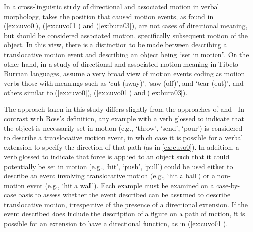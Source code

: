 In a cross-linguistic study of directional and associated motion in verbal morphology, \citet[62]{rossCrosslinguisticSurveyAssociated2021} takes the position that caused motion events, as found in (\ref{ex:cuvo0}), (\ref{ex:cuvo01}) and (\ref{ex:bura03}), are not cases of directional meaning, but should be considered associated motion, specifically subsequent motion of the object. In this view, there is a distinction to be made between describing a translocative motion event and describing an object being ``set in motion''. On the other hand, in a study of directional and associated motion meaning in Tibeto-Burman languages, \citet[357]{genettiDirectionAssociatedMotion2020} assume a very broad view of motion events coding as motion verbs those with meanings such as `cut (away)', `saw (off)', and `tear (out)', and others similar to (\ref{ex:cuvo0}), (\ref{ex:cuvo01}) and (\ref{ex:bura03}).
	
The approach taken in this study differs slightly from the approaches of \citet{rossCrosslinguisticSurveyAssociated2021,rossPseudocoordinationSerialVerb2021} and \citet{genettiDirectionAssociatedMotion2020}. In contrast with Ross's definition, any example with a verb glossed to indicate that the object is necessarily set in motion (e.g., `throw', `send', `pour') is considered to describe a translocative motion event, in which case it is possible for a verbal extension to specify the direction of that path (as in \ref{ex:cuvo0}). In addition, a verb glossed to indicate that force is applied to an object such that it could potentially be set in motion (e.g., `hit', `push', `pull') could be used either to describe an event involving translocative motion (e.g., `hit a ball') or a non-motion event (e.g., `hit a wall'). Each example must be examined on a case-by-case basis to assess whether the event described can be assumed to describe translocative motion, irrespective of the presence of a directional extension. If the event described does include the description of a figure on a path of motion, it is possible for an extension to have a directional function, as in (\ref{ex:cuvo01}). 

